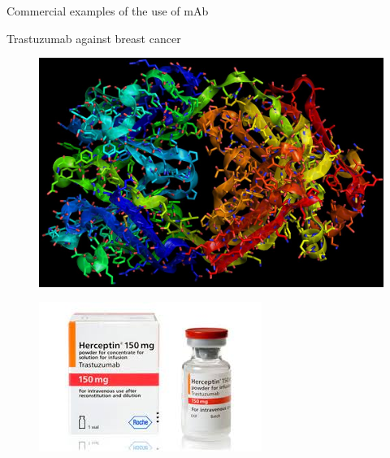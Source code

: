 \begin{frame}{Commercial examples of the use of mAb}
    \begin{block}{Trastuzumab against breast cancer}
        \vspace{1em}
        \begin{minipage}{0.395\textwidth}
            \begin{figure}
                \centering
                \includegraphics[width=\textwidth]{../Images/herceptin.jpg}
            \end{figure}  
        \end{minipage}\hfill
        \begin{minipage}{0.6\textwidth}
            \begin{figure}
                \centering
                \includegraphics[width=\textwidth]{../Images/trastuzumab.jpg}
            \end{figure}    
        \end{minipage}
    \end{block}

\end{frame}